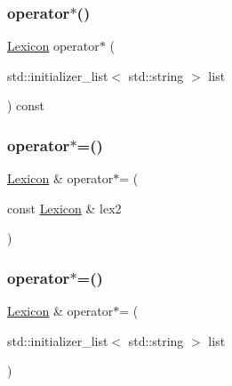 \mbox{\label{classLexicon_a5da3a8f0f6332bccefe7b2cb48d8a8d6}} 
\subsubsection{\texorpdfstring{operator$\ast$()}{operator*()}\hspace{0.1cm}{\footnotesize\ttfamily [2/2]}}
{\footnotesize\ttfamily \mbox{\hyperlink{classLexicon}{Lexicon}} operator$\ast$ (\begin{DoxyParamCaption}\item[{std\+::initializer\+\_\+list$<$ std\+::string $>$}]{list }\end{DoxyParamCaption}) const}

\mbox{\label{classLexicon_ab81e3c0d6a5637202849784ef00b9cd5}} 
\subsubsection{\texorpdfstring{operator$\ast$=()}{operator*=()}\hspace{0.1cm}{\footnotesize\ttfamily [1/2]}}
{\footnotesize\ttfamily \mbox{\hyperlink{classLexicon}{Lexicon}} \& operator$\ast$= (\begin{DoxyParamCaption}\item[{const \mbox{\hyperlink{classLexicon}{Lexicon}} \&}]{lex2 }\end{DoxyParamCaption})}

\mbox{\label{classLexicon_a79ada3cb64d9f074114ce895c67be781}} 
\subsubsection{\texorpdfstring{operator$\ast$=()}{operator*=()}\hspace{0.1cm}{\footnotesize\ttfamily [2/2]}}
{\footnotesize\ttfamily \mbox{\hyperlink{classLexicon}{Lexicon}} \& operator$\ast$= (\begin{DoxyParamCaption}\item[{std\+::initializer\+\_\+list$<$ std\+::string $>$}]{list }\end{DoxyParamCaption})}


